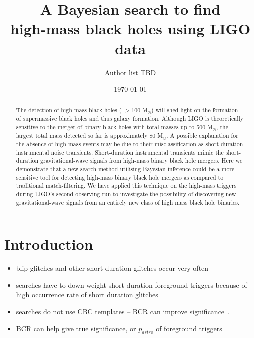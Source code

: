 \documentclass[%
 reprint,
 amsmath,amssymb,
 aps,
]{revtex4-2}
\begin{document}

\title{A Bayesian search to find \\high-mass black holes using LIGO data}%


\author{Author list TBD}

\date{\today}

\begin{abstract}
The detection of high mass black holes ( $>100$ M${}_\odot$) will shed light on the formation of supermassive black holes and thus galaxy formation. Although LIGO is theoretically sensitive to the merger of binary black holes with total masses up to 500 M${}_\odot$, the largest total mass detected so far is approximately 80 M${}_\odot$. A possible explanation for the absence of high mass events may be due to their misclassification as short-duration instrumental noise transients. Short-duration instrumental transients mimic the short-duration gravitational-wave signals from high-mass binary black hole mergers. Here we demonstrate that a new search method utilising Bayesian inference could be a more sensitive tool for detecting high-mass binary black hole mergers as compared to traditional match-filtering. We have applied this technique on the high-mass triggers during LIGO's second observing run to investigate the possibility of discovering new gravitational-wave signals from an entirely new class of high mass black hole binaries.


\end{abstract}

\maketitle



\section{\label{sec:Introduction}Introduction}

\begin{itemize}
    \item blip glitches and other short duration glitches occur very often
    \item searches have to down-weight short duration foreground triggers because of high occurrence rate of short duration glitches
    \item searches do not use CBC templates -- BCR can improve significance~\cite{BCR1}.
    \item BCR can help give true significance, or $p_{astro}$ of foreground triggers
\end{itemize}
\end{document}
